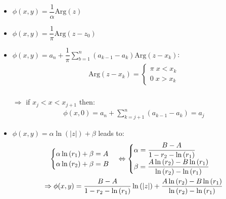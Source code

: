 \begin{itemize}
  \item $\phi(x,y) = \dfrac{1}{\alpha}\text{Arg}(z)$
    \par\bigskip
  \item $\phi(x,y) = \dfrac{1}{\pi}\text{Arg}(z-z_0)$
    \par\bigskip
  \item $\phi(x,y) = a_n+\dfrac{1}{\pi}\sum_{b=1}^{n}(a_{k-1}-a_k)\text{Arg}(z-x_k)$:
    \begin{equation*}
      \begin{gathered}
        \text{Arg}(z-x_k) = \begin{cases}\pi\; x<x_k\\0\;x>x_k\end{cases}\\
      \end{gathered}
    \end{equation*}\par
    $\Rightarrow$ if $x_j<x<x_{j+1}$ then:
    \begin{equation*}
      \begin{gathered}
        \phi(x,0) = a_n+\sum_{k=j+1}^{n}(a_{k-1}-a_k) = a_j
      \end{gathered}
    \end{equation*}
    \par\bigskip
  \item $\phi(x,y) = \alpha\ln{\left(\left|z\right|\right)}+\beta$ leads to:
    \begin{equation*}
      \begin{gathered}
        \begin{cases}
          \alpha\ln{\left(r_1\right)}+\beta = A\\
          \alpha\ln{\left(r_2\right)}+\beta = B
        \end{cases}\Leftrightarrow
        \begin{cases}
          \alpha = \dfrac{B-A}{1-r_2-\ln{\left(r_1\right)}}\\
          \beta = \dfrac{A\ln{\left(r_2\right)}-B\ln{\left(r_1\right)}}{\ln{\left(r_2\right)}-\ln{\left(r_1\right)}}
        \end{cases}\\
        \Rightarrow \phi(x,y) = \dfrac{B-A}{1-r_2-\ln{\left(r_1\right)}}\ln{\left(\left|z\right|\right)}+\dfrac{A\ln{\left(r_2\right)}-B\ln{\left(r_1\right)}}{\ln{\left(r_2\right)}-\ln{\left(r_1\right)}}
      \end{gathered}
    \end{equation*}
\end{itemize}
